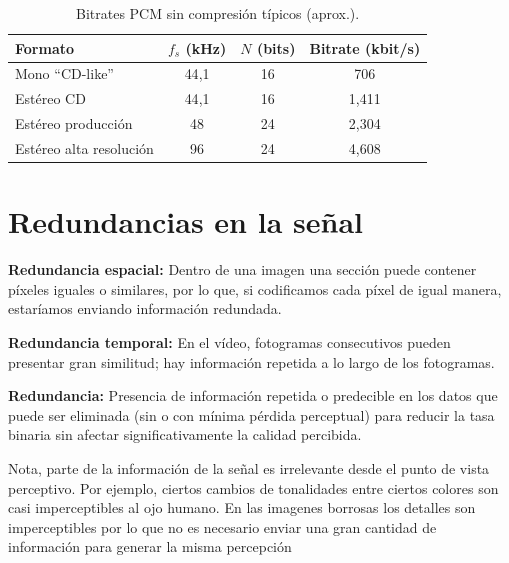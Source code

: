\documentclass[11pt,a4paper]{article}
\begin{document}
\begin{table}[h!]
\centering
\begin{tabular}{lccc}
\hline
\textbf{Formato} & $f_s$ (kHz) & $N$ (bits) & \textbf{Bitrate} (kbit/s) \\
\hline
Mono ``CD-like''     & 44{,}1 & 16 & 706 \\
Estéreo CD           & 44{,}1 & 16 & 1{,}411 \\
Estéreo producción   & 48     & 24 & 2{,}304 \\
Estéreo alta resolución & 96  & 24 & 4{,}608 \\
\hline
\end{tabular}
\caption{Bitrates PCM sin compresión típicos (aprox.).}
\end{table}

\section{Redundancias en la señal}

\begin{DefBox}
\textbf{Redundancia espacial:} Dentro de una imagen una sección puede contener píxeles iguales o similares, por lo que, si codificamos cada píxel de igual manera, estaríamos enviando información redundada.
\end{DefBox}

\begin{DefBox}
\textbf{Redundancia temporal:} En el vídeo, fotogramas consecutivos pueden presentar gran similitud; hay información repetida a lo largo de los fotogramas.
\end{DefBox}

\begin{DefBox}
\textbf{Redundancia:} Presencia de información repetida o predecible en los datos que puede ser eliminada (sin o con mínima pérdida perceptual) para reducir la tasa binaria sin afectar significativamente la calidad percibida.
\end{DefBox}

\begin{NotaBox}
Nota, parte de la información de la señal es irrelevante desde el punto de vista perceptivo. Por ejemplo, ciertos cambios de tonalidades entre ciertos colores son casi imperceptibles al ojo humano. En las imagenes borrosas los detalles son imperceptibles por lo que no es necesario enviar una gran cantidad de información para generar la misma percepción
\end{NotaBox}
\end{document}
